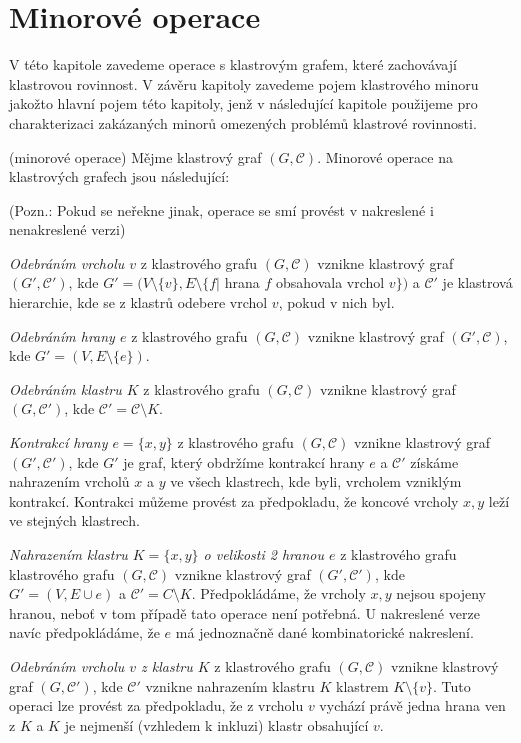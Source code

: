 \chapter{Minorové operace}

V této kapitole zavedeme operace s klastrovým grafem, které zachovávají klastrovou rovinnost. V závěru kapitoly zavedeme pojem klastrového minoru jakožto hlavní pojem této kapitoly, jenž v následující kapitole použijeme pro charakterizaci zakázaných minorů omezených problémů klastrové rovinnosti.

\begin{defn} (minorové operace) Mějme klastrový graf $(G, \mathcal C)$. Minorové operace na klastrových grafech jsou následující:

(Pozn.: Pokud se neřekne jinak, operace se smí provést v nakreslené i nenakreslené verzi)

\textit{Odebráním vrcholu $v$} z klastrového grafu $(G, \mathcal C)$ vznikne klastrový graf  $(G', \mathcal C')$, kde  $G' = (V \setminus \{v\}, E \setminus \{f |$ hrana $f$ obsahovala vrchol $v\})$ a $\mathcal C'$ je klastrová hierarchie, kde se z klastrů odebere vrchol $v$, pokud v nich byl.

\textit{Odebráním hrany $e$} z klastrového grafu $(G, \mathcal C)$ vznikne klastrový graf  $(G', \mathcal C)$, kde $G' =  (V,E \setminus \{e\})$.

\textit{Odebráním klastru $K$} z klastrového grafu $(G, \mathcal C)$ vznikne klastrový graf  $(G, \mathcal C')$, kde $\mathcal C' = \mathcal C \setminus K$.

\textit{Kontrakcí hrany $e=\{x,y\}$} z klastrového grafu $(G, \mathcal C)$ vznikne klastrový graf  $(G', \mathcal C')$, kde $G'$ je graf, který obdržíme kontrakcí hrany $e$ a $\mathcal C'$ získáme nahrazením vrcholů $x$ a $y$ ve všech klastrech, kde byli, vrcholem vzniklým kontrakcí. Kontrakci můžeme provést za předpokladu, že koncové vrcholy $x, y$ leží ve stejných klastrech.

\textit{Nahrazením klastru $K=\{x,y\}$ o velikosti 2 hranou $e$} z klastrového grafu klastrového grafu $(G, \mathcal C)$ vznikne klastrový graf  $(G', \mathcal C')$, kde $G'=(V,E \cup e)$ a $\mathcal C'= C \setminus K$. Předpokládáme, že vrcholy $x, y$ nejsou spojeny hranou, neboť v tom případě tato operace není potřebná. U nakreslené verze navíc předpokládáme, že $e$ má jednoznačně dané kombinatorické nakreslení.

\textit{Odebráním vrcholu $v$ z klastru $K$} z klastrového grafu $(G, \mathcal C)$ vznikne klastrový graf  $(G, \mathcal C')$, kde $\mathcal C'$ vznikne nahrazením klastru $K$ klastrem $K \setminus \{v\}$. Tuto operaci lze provést za předpokladu, že z vrcholu $v$ vychází právě jedna hrana ven z $K$ a $K$ je nejmenší (vzhledem k inkluzi) klastr obsahující $v$.


\end{defn}

